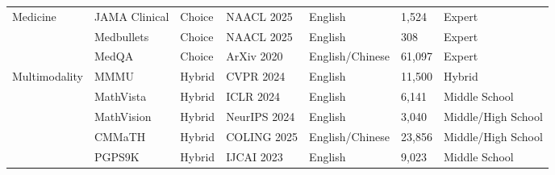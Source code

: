 \begin{table*}[tbhp]
{\begin{tabular}{lllllll}
\hline
\multirow{3}{*}{Medicine}      
&  JAMA Clinical \cite{chen2024benchmarking} & Choice &  NAACL 2025   & English  &  1,524  &  Expert      \\

& \cellcolor[rgb]{ .949,  .949,  .949}Medbullets \cite{chen2024benchmarking}  & \cellcolor[rgb]{ .949,  .949,  .949}Choice & \cellcolor[rgb]{ .949,  .949,  .949}NAACL 2025   & \cellcolor[rgb]{ .949,  .949,  .949}English      & \cellcolor[rgb]{ .949,  .949,  .949}308    & \cellcolor[rgb]{ .949,  .949,  .949}Expert             \\

&  MedQA \cite{jin2021disease}  & Choice  &  ArXiv 2020   & English/Chinese &  61,097 &  Expert             \\

\hline
\multirow{5}{*}{Multimodality} 
& \cellcolor[rgb]{ .949,  .949,  .949}MMMU \cite{yue2024mmmu} & \cellcolor[rgb]{ .949,  .949,  .949}Hybrid & \cellcolor[rgb]{ .949,  .949,  .949}CVPR 2024    & \cellcolor[rgb]{ .949,  .949,  .949}English         & \cellcolor[rgb]{ .949,  .949,  .949}11,500 & \cellcolor[rgb]{ .949,  .949,  .949}Hybrid             \\

&  MathVista   \cite{lu2024mathvista}  & Hybrid &  ICLR 2024    &  English         &  6,141  &  Middle School      \\

& \cellcolor[rgb]{ .949,  .949,  .949}MathVision \cite{MathVision}   & \cellcolor[rgb]{ .949,  .949,  .949}Hybrid & \cellcolor[rgb]{ .949,  .949,  .949}NeurIPS 2024 & \cellcolor[rgb]{ .949,  .949,  .949}English         & \cellcolor[rgb]{ .949,  .949,  .949}3,040  & \cellcolor[rgb]{ .949,  .949,  .949}Middle/High School \\

&  CMMaTH \cite{li2024cmmath}  & Hybrid &  COLING 2025  & English/Chinese &  23,856 & Middle/High School \\

& \cellcolor[rgb]{ .949,  .949,  .949}PGPS9K \cite{Zhang2023PGPS}  & \cellcolor[rgb]{ .949,  .949,  .949}Hybrid & \cellcolor[rgb]{ .949,  .949,  .949}IJCAI 2023   & \cellcolor[rgb]{ .949,  .949,  .949}English         & \cellcolor[rgb]{ .949,  .949,  .949}9,023  & \cellcolor[rgb]{ .949,  .949,  .949}Middle School  \\ 
\bottomrule[1.2pt]
\end{tabular}
}
\label{table:benchmark_categories}
\end{table*}


